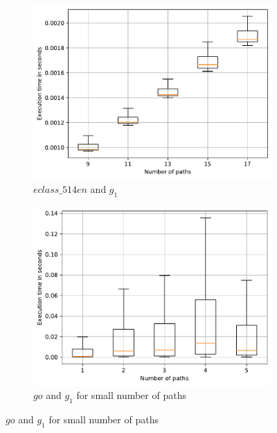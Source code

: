 \begin{figure}
	\begin{subfigure}{0.32\textwidth}
		\includegraphics[width=\linewidth,trim=0 0 -1.5cm 0]{pictures/tensor_eclass_514en_10_small.pdf}
		\caption{$eclass\_514en$ and $g_1$} \label{fig:extractTimeEclassTns}
	\end{subfigure}
	\hspace*{\fill} %
	\begin{subfigure}{0.32\textwidth}
		\includegraphics[width=\linewidth,trim=0 0 -1.5cm 0]{pictures/tensor_go_10_small.pdf}
		\caption{$go$ and $g_1$ for small number of paths} \label{fig:extractTimeGoSmallTns}
	\end{subfigure}
	\hspace*{\fill} %

\end{figure}
